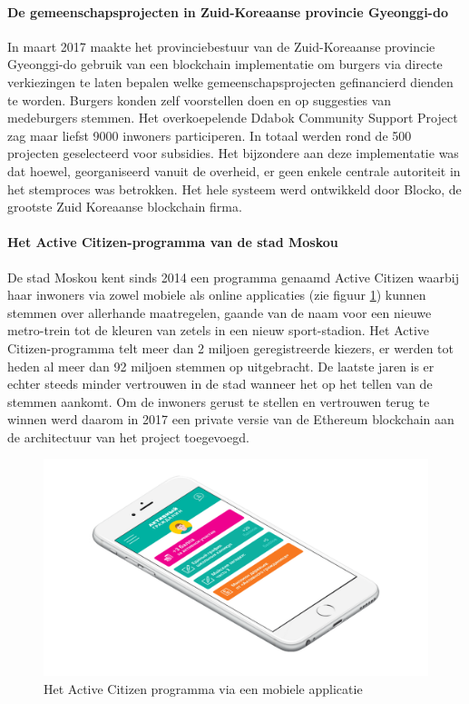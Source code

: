 				\paragraph{De gemeenschapsprojecten in Zuid-Koreaanse provincie Gyeonggi-do}
				In maart 2017 maakte het provinciebestuur van de Zuid-Koreaanse provincie Gyeonggi-do gebruik van een blockchain implementatie om burgers via directe verkiezingen te laten  bepalen welke gemeenschapsprojecten gefinancierd dienden te worden. Burgers konden zelf voorstellen doen en op suggesties van medeburgers stemmen. Het overkoepelende Ddabok Community Support Project zag maar liefst 9000 inwoners participeren. In totaal werden rond de 500  projecten geselecteerd voor subsidies. Het bijzondere aan deze implementatie was dat hoewel, georganiseerd vanuit de overheid, er geen enkele centrale autoriteit in het stemproces was betrokken. Het hele systeem werd ontwikkeld door Blocko, de grootste Zuid Koreaanse blockchain firma. ~\autocite{Kshetri2018}
				
				\paragraph{Het Active Citizen-programma van de stad Moskou}
				De stad Moskou kent sinds 2014 een programma genaamd Active Citizen waarbij haar inwoners via zowel mobiele als online applicaties (zie figuur \ref{fig:active_citizen}) kunnen stemmen over allerhande maatregelen, gaande van de naam voor een nieuwe metro-trein tot de kleuren van zetels in een nieuw sport-stadion. Het Active Citizen-programma telt meer dan 2 miljoen geregistreerde kiezers, er werden tot heden al meer dan 92 miljoen stemmen op uitgebracht. De laatste jaren is er echter steeds minder vertrouwen in de stad wanneer het op het tellen van de stemmen aankomt. Om de inwoners gerust te stellen en vertrouwen terug te winnen werd  daarom in 2017 een private versie van de Ethereum blockchain aan de architectuur van het project toegevoegd. ~\autocite{Kshetri2018}
				
				\begin{figure}
					\includegraphics[width=\linewidth]{img/active_citizen.png}
					\caption{Het Active Citizen programma via een mobiele applicatie}
					\label{fig:active_citizen}
				\end{figure}
				
